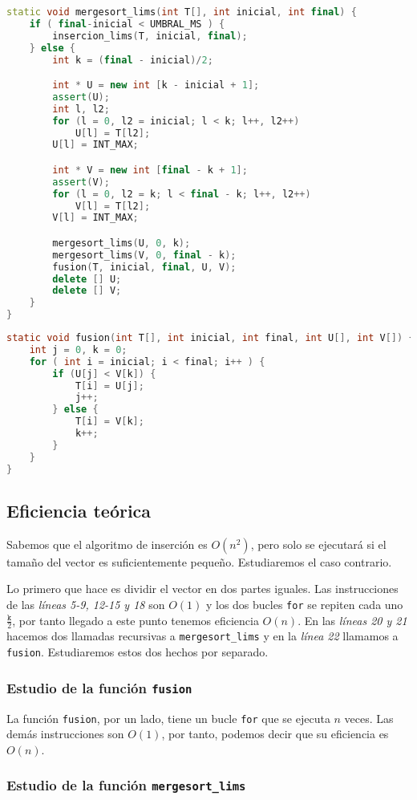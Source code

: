 \documentclass[10pt, a4paper]{article}
\theoremstyle{theorem-style}
\theoremstyle{theorem-style}
\theoremstyle{definition-style}
\theoremstyle{remark-style}
\theoremstyle{example-style}
\theoremstyle{definition-style}
\theoremstyle{remark-style}
\begin{document}
\begin{lstlisting}[language=C++] 
static void mergesort_lims(int T[], int inicial, int final) {
	if ( final-inicial < UMBRAL_MS ) {
		insercion_lims(T, inicial, final);
	} else {
		int k = (final - inicial)/2;

		int * U = new int [k - inicial + 1];
		assert(U);
		int l, l2;
		for (l = 0, l2 = inicial; l < k; l++, l2++)
			U[l] = T[l2];
		U[l] = INT_MAX;

		int * V = new int [final - k + 1];
		assert(V);
		for (l = 0, l2 = k; l < final - k; l++, l2++)
			V[l] = T[l2];
		V[l] = INT_MAX;

		mergesort_lims(U, 0, k);
		mergesort_lims(V, 0, final - k);
		fusion(T, inicial, final, U, V);
		delete [] U;
		delete [] V;
	}
}
\end{lstlisting}
\begin{lstlisting}[language=C]
static void fusion(int T[], int inicial, int final, int U[], int V[]) {
	int j = 0, k = 0;
	for ( int i = inicial; i < final; i++ ) {
		if (U[j] < V[k]) {
			T[i] = U[j];
			j++;
		} else {
			T[i] = V[k];
			k++;
		}
	}
}
\end{lstlisting}

\subsection{Eficiencia teórica}

Sabemos que el algoritmo de inserción es $O(n^2)$, pero solo se ejecutará si el tamaño del vector es suficientemente pequeño. Estudiaremos el caso contrario.

Lo primero que hace es dividir el vector en dos partes iguales. Las instrucciones de las \emph{líneas 5-9, 12-15 y 18} son $O(1)$ y los dos bucles \texttt{for} se repiten cada uno $\frac{\texttt{k}}{2}$, por tanto llegado a este punto tenemos eficiencia $O(n)$. En las \emph{líneas 20 y 21} hacemos dos llamadas recursivas a \texttt{mergesort\_lims} y en la \emph{línea 22} llamamos a \texttt{fusion}. Estudiaremos estos dos hechos por separado.

\subsubsection*{Estudio de la función \texttt{fusion}}
La función \texttt{fusion}, por un lado, tiene un bucle \texttt{for} que se ejecuta $n$ veces. Las demás instrucciones son $O(1)$, por tanto, podemos decir que su eficiencia es $O(n)$.

\subsubsection*{Estudio de la función \texttt{mergesort\_lims}}
\end{document}
